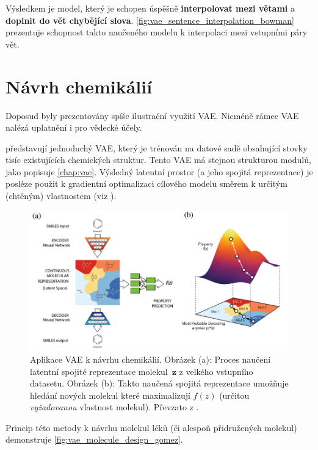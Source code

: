 Výsledkem je model, který je schopen úspěšně \textbf{interpolovat mezi větami} a \textbf{doplnit do vět chybějící slova}. \autoref{fig:vae_sentence_interpolation_bowman} prezentuje schopnost takto naučeného modelu k interpolaci mezi vstupními páry vět. \cite{Bowman2016}

\newpage
\section{Návrh chemikálií}
\label{sec:applications_chemical_pseudo_data_synthesis}
Doposud byly prezentovány spíše ilustrační využití VAE. Nicméně rámec VAE nalézá uplatnění i pro vědecké účely.
 

\textcite{GomezBombarelli2018} představují jednoduchý VAE, který je trénován na datové sadě obsahující stovky tisíc existujících chemických struktur.
Tento VAE má stejnou strukturou modulů, jako popisuje \autoref{chap:vae}.
Výsledný latentní prostor (a jeho spojitá reprezentace) je posléze použit k gradientní optimalizaci cílového modelu směrem k určitým (chtěným) vlastnostem (viz \textcite{GomezBombarelli2018}).

\begin{figure}[H]
    \centering
    \includegraphics[width=\textwidth]{figures/applications/vae_molecule_design_gomez.png}
    \caption{Aplikace VAE k návrhu chemikálií. Obrázek (a): Proces naučení latentní spojité reprezentace molekul $\mathbf{z}$ z velkého vstupního datasetu. Obrázek (b): Takto naučená spojitá reprezentace umožňuje hledání nových molekul které maximalizují $f(z)$ (určitou \emph{vyžadovanou} vlastnost molekul). Převzato z \textcite{GomezBombarelli2018}.}
    \label{fig:vae_molecule_design_gomez}
\end{figure}

Princip této metody k návrhu molekul léků (či alespoň přidružených molekul) demonstruje \autoref{fig:vae_molecule_design_gomez}. \cite{Kingma2019}

